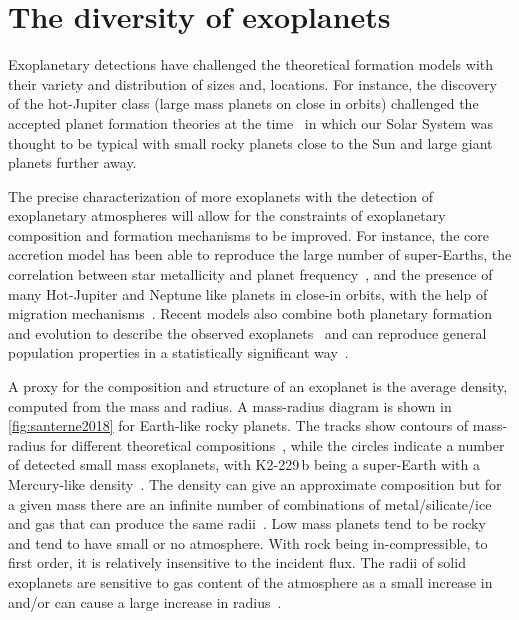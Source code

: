 
\section{The diversity of exoplanets}
\label{sec:exoplanet_diversity}
Exoplanetary detections have challenged the theoretical formation models with their variety and distribution of sizes and, locations.
For instance, the discovery of the hot-Jupiter class (large mass planets on close in orbits) challenged the accepted planet formation theories at the time~\citep[e.g.][]{pollack_formation_1996, boss_giant_1997} in which our Solar System was thought to be typical with small rocky planets close to the Sun and large giant planets further away.

The precise characterization of more exoplanets with the detection of exoplanetary atmospheres will allow for the constraints of exoplanetary composition and formation mechanisms to be improved.
For instance, the core accretion model has been able to reproduce the large number of super-Earths, the correlation between star metallicity and planet frequency~\citep[e.g.][]{santos_spectroscopic_2004, fischer_planetmetallicity_2005}, and the presence of many Hot-Jupiter and Neptune like planets in close-in orbits, with the help of migration mechanisms~\citep[e.g.][]{triaud_exoplanets_2016}.
Recent models also combine both planetary formation and evolution to describe the observed exoplanets~\citep[e.g.][]{mordasini_characterization_2012} and can reproduce general population properties in a statistically significant way~\citep{mordasini_extrasolar_2009}.

A proxy for the composition and structure of an exoplanet is the average density, computed from the mass and radius.
A mass-radius diagram is shown in \cref{fig:santerne2018} for Earth-like rocky planets.
The tracks show contours of mass-radius for different theoretical compositions~\citep{brugger_constraints_2017}, while the circles indicate a number of detected small mass exoplanets, with {K2-229\,b} being a super-Earth with a Mercury-like density~\citep{santerne_earthsized_2018}.
The density can give an approximate composition but for a given mass there are an infinite number of combinations of metal/silicate/ice and gas that can produce the same radii~\citep[e.g.][]{seager_massradius_2007}.
Low mass planets tend to be rocky and tend to have small or no atmosphere.
With rock being in-compressible, to first order, it is relatively insensitive to the incident flux.
The radii of solid exoplanets are sensitive to gas content of the atmosphere as a small increase in  and/or  can cause a large increase in radius~\citep{adams_ocean_2008}.

